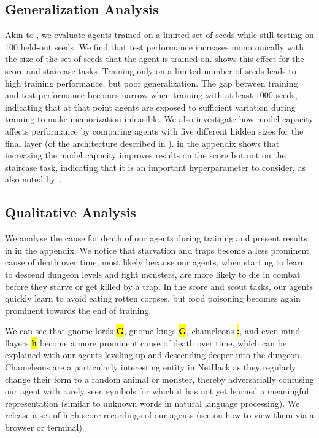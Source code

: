 \documentclass{article}
\newcommand{\MindFlayer}{{\bf\ttfamily\color{nethack_magenta}\sethlcolor{black}\hl{h}}}
\newcommand{\GnomeLord}{{\bf\ttfamily\color{nethack_blue}\sethlcolor{black}\hl{G}}}
\newcommand{\GnomeKing}{{\bf\ttfamily\color{nethack_magenta}\sethlcolor{black}\hl{G}}}
\newcommand{\Chameleon}{{\bf\ttfamily\color{nethack_yellow}\sethlcolor{black}\hl{:}}}
\begin{document}
\subsection{Generalization Analysis}
Akin to \citep{cobbe2019procgen}, we evaluate agents trained on a limited set of seeds while still testing on 100 held-out seeds.
We find that test performance increases monotonically with the size of the set of seeds that the agent is trained on.  shows this effect for the score and staircase tasks. Training only on a limited number of seeds leads to high training performance, but poor generalization.
The gap between training and test performance becomes narrow when training with at least $1000$ seeds, indicating that at that point agents are exposed to sufficient variation during training to make memorization infeasible.
We also investigate how model capacity affects performance by comparing agents with five different hidden sizes for the final layer (of the architecture described in ).
 in the appendix shows that increasing the model capacity improves results on the score but not on the staircase task, indicating that it is an important hyperparameter to consider, as also noted by~\citep{cobbe2019procgen}.


\subsection{Qualitative Analysis}
We analyse the cause for death of our agents during training and present results in  in the appendix.
We notice that starvation and traps become a less prominent cause of death over time, most likely because our agents, when starting to learn to descend dungeon levels and fight monsters, are more likely to die in combat before they starve or get killed by a trap.
In the score and scout tasks, our agents quickly learn to avoid eating rotten corpses, but food poisoning becomes again prominent towards the end of training.

We can see that gnome lords \GnomeLord{}, gnome kings \GnomeKing{}, chameleons \Chameleon{}, and even mind flayers \MindFlayer{} become a
more prominent cause of death over time, which can be explained with our agents leveling up and descending deeper into the dungeon.
Chameleons are a particularly interesting entity in NetHack as they regularly change their form to a random animal or monster, thereby adversarially confusing our agent with rarely seen symbols for which it has not yet learned a meaningful representation  (similar to unknown words in natural language processing).
We release a set of high-score recordings of our agents (see  on how to view them via a browser or terminal).
\end{document}
